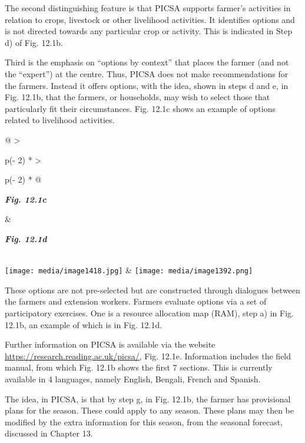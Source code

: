 \documentclass[
  letterpaper,
  DIV=11,
  numbers=noendperiod]{scrreprt}
\begin{document}
The second distinguishing feature is that PICSA supports farmer's
activities in relation to crops, livestock or other livelihood
activities. It identifies options and is not directed towards any
particular crop or activity. This is indicated in Step d) of Fig. 12.1b.

Third is the emphasis on ``options by context'' that places the farmer
(and not the ``expert'') at the centre. Thus, PICSA does not make
recommendations for the farmers. Instead it offers options, with the
idea, shown in steps d and e, in Fig. 12.1b, that the farmers, or
households, may wish to select those that particularly fit their
circumstances. Fig. 12.1c shows an example of options related to
livelihood activities.

\begin{longtable}[]{@{}
  >{\raggedright\arraybackslash}p{(\columnwidth - 2\tabcolsep) * }
  >{\raggedright\arraybackslash}p{(\columnwidth - 2\tabcolsep) * }@{}}
\toprule\noalign{}
\begin{minipage}[b]{\linewidth}\raggedright
\textbf{\emph{Fig. 12.1c}}
\end{minipage} & \begin{minipage}[b]{\linewidth}\raggedright
\textbf{\emph{Fig. 12.1d}}
\end{minipage} \\
\midrule\noalign{}
\endhead
\bottomrule\noalign{}
\endlastfoot
\texttt{[image: media/image1418.jpg]}
&
\texttt{[image: media/image1392.png]} \\
\end{longtable}

These options are not pre-selected but are constructed through dialogues
between the farmers and extension workers. Farmers evaluate options via
a set of participatory exercises. One is a resource allocation map
(RAM), step a) in Fig. 12.1b, an example of which is in Fig. 12.1d.

Further information on PICSA is available via the website
\href{https://research.reading.ac.uk/picsa/}{\ul{https://research.reading.ac.uk/picsa/}},
Fig. 12.1e. Information includes the field manual, from which Fig. 12.1b
shows the first 7 sections. This is currently available in 4 languages,
namely English, Bengali, French and Spanish.

The idea, in PICSA, is that by step g, in Fig. 12.1b, the farmer has
provisional plans for the season. These could apply to any season. These
plans may then be modified by the extra information for this season,
from the seasonal forecast, discussed in Chapter 13.
\end{document}

